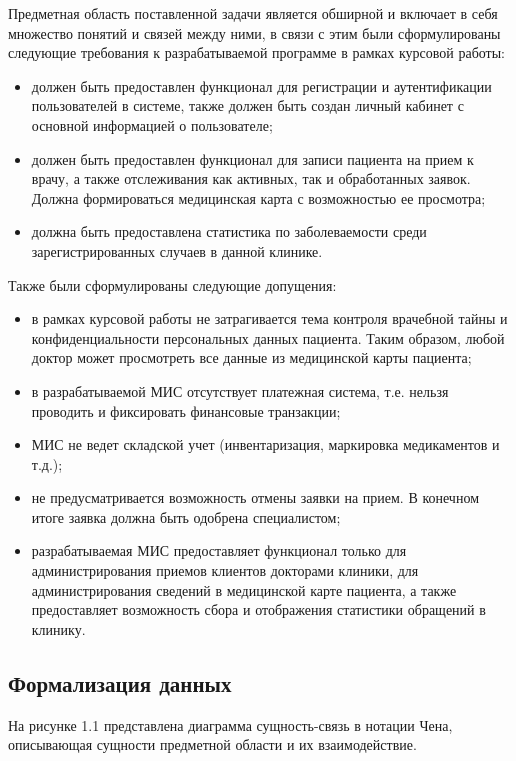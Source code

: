 Предметная область поставленной задачи является обширной и включает в себя множество понятий и связей между ними, в связи с этим были сформулированы следующие требования к разрабатываемой программе в рамках курсовой работы:

\begin{itemize}
	\item должен быть предоставлен функционал для регистрации и аутентификации пользователей в системе, также должен быть создан личный кабинет с основной информацией о пользователе;
	\item должен быть предоставлен функционал для записи пациента на прием к врачу, а также отслеживания как активных, так и обработанных заявок. Должна формироваться медицинская карта с возможностью ее просмотра;
	\item должна быть предоставлена статистика по заболеваемости среди зарегистрированных случаев в данной клинике.
\end{itemize}

Также были сформулированы следующие допущения:

\begin{itemize}
	\item в рамках курсовой работы не затрагивается тема контроля врачебной тайны и  конфиденциальности персональных данных пациента. Таким образом, любой доктор может просмотреть все данные из медицинской карты пациента;
	\item в разрабатываемой МИС отсутствует платежная система, т.е. нельзя проводить и фиксировать финансовые транзакции;
	\item МИС не ведет складской учет (инвентаризация, маркировка медикаментов и т.д.);
	\item не предусматривается возможность отмены заявки на прием. В конечном итоге заявка должна быть одобрена специалистом;
	\item разрабатываемая МИС предоставляет функционал только для администрирования приемов клиентов докторами клиники, для администрирования сведений в медицинской карте пациента, а также предоставляет возможность сбора и отображения статистики обращений в клинику.
\end{itemize}

\clearpage

\subsection*{Формализация данных}

На рисунке 1.1 представлена диаграмма сущность-связь в нотации Чена\cite{erm}, описывающая сущности предметной области и их взаимодействие.

